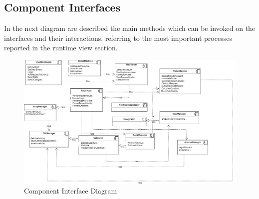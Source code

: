 \subsection{Component Interfaces}
In the next diagram are described the main methods which can be invoked on the interfaces and their interactions, referring to the most important processes reported in the runtime view section.
\begin{figure}[H]
  \centering
  \includegraphics[width=\textwidth, keepaspectratio]{images/Component Interfaces.png}
  \caption{Component Interface Diagram}
\end{figure}
\vspace{2cm}